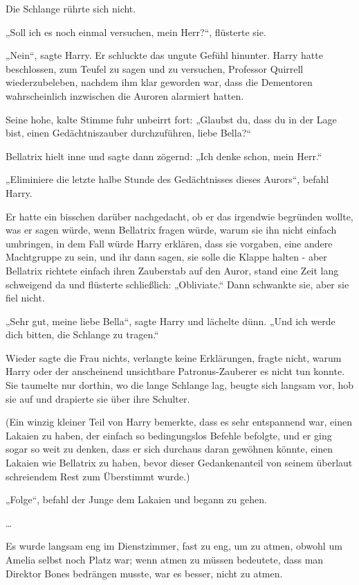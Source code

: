 {Die Schlange rührte sich nicht.

„Soll ich es noch einmal versuchen, mein Herr?“, flüsterte sie.

„Nein“, sagte Harry. Er schluckte das ungute Gefühl hinunter. Harry hatte beschlossen, zum Teufel zu sagen und zu versuchen, Professor Quirrell wiederzubeleben, nachdem ihm klar geworden war, dass die Dementoren wahrscheinlich inzwischen die Auroren alarmiert hatten.

Seine hohe, kalte Stimme fuhr unbeirrt fort: „Glaubst du, dass du in der Lage bist, einen Gedächtniszauber durchzuführen, liebe Bella?“

Bellatrix hielt inne und sagte dann zögernd: „Ich denke schon, mein Herr.“

„Eliminiere die letzte halbe Stunde des Gedächtnisses dieses Aurors“, befahl Harry.

Er hatte ein bisschen darüber nachgedacht, ob er das irgendwie begründen wollte, was er sagen würde, wenn Bellatrix fragen würde, warum sie ihn nicht einfach umbringen, in dem Fall würde Harry erklären, dass sie vorgaben, eine andere Machtgruppe zu sein, und ihr dann sagen, sie solle die Klappe halten - aber Bellatrix richtete einfach ihren Zauberstab auf den Auror, stand eine Zeit lang schweigend da und flüsterte schließlich: „Obliviate.“ Dann schwankte sie, aber sie fiel nicht.

„Sehr gut, meine liebe Bella“, sagte Harry und lächelte dünn. „Und ich werde dich bitten, die Schlange zu tragen.“

Wieder sagte die Frau nichts, verlangte keine Erklärungen, fragte nicht, warum Harry oder der anscheinend unsichtbare Patronus-Zauberer es nicht tun konnte. Sie taumelte nur dorthin, wo die lange Schlange lag, beugte sich langsam vor, hob sie auf und drapierte sie über ihre Schulter.

(Ein winzig kleiner Teil von Harry bemerkte, dass es sehr entspannend war, einen Lakaien zu haben, der einfach so bedingungslos Befehle befolgte, und er ging sogar so weit zu denken, dass er sich durchaus daran gewöhnen könnte, einen Lakaien wie Bellatrix zu haben, bevor dieser Gedankenanteil von seinem überlaut schreiendem Rest zum Überstimmt wurde.)

„Folge“, befahl der Junge dem Lakaien und begann zu gehen.

…

Es wurde langsam eng im Dienstzimmer, fast zu eng, um zu atmen, obwohl um Amelia selbst noch Platz war; wenn atmen zu müssen bedeutete, dass man Direktor Bones bedrängen musste, war es besser, nicht zu atmen.

}
